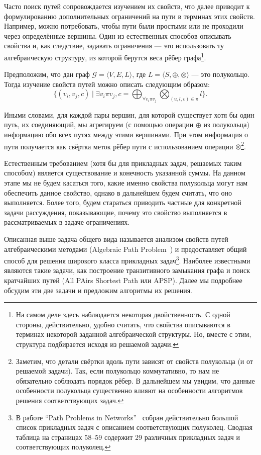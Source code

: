 Часто поиск путей сопровождается изучением их свойств, что далее приводит к формулированию дополнительных ограничений на пути в терминах этих свойств. Например, можно потребовать, чтобы пути были простыми или не проходили через определённые вершины. Один из естественных способов описывать свойства и, как следствие, задавать ограничения --- это использовать ту алгебраическую структуру, из которой берутся веса рёбер графа\footnote{На самом деле здесь наблюдается некоторая двойственность. С одной стороны, действительно, удобно считать, что свойства описываются в терминах некоторой заданной алгебраической структуры. Но, вместе с этим, структура подбирается исходя из решаемой задачи.}.

Предположим, что дан граф $\mathcal{G} = \langle V, E, L\rangle $, где $L = \langle S, \oplus, \otimes \rangle$ --- это полукольцо. Тогда изучение свойств путей можно описать следующим образом:
\begin{equation} \label{eq:algPathProblem}
  \{(v_i, v_j, c) \mid \exists v_i \pi v_j, c = \bigoplus_{\forall v_i \pi v_j} \bigotimes_{(u,l,v) \in \pi } l \}.
\end{equation}

Иными словами, для каждой пары вершин, для которой существует хотя бы один путь, их соединяющий, мы агрегируем (с помощью операции $\oplus$ из полукольца) информацию обо всех путях между этими вершинами. При этом информация о пути получается как свёртка меток рёбер пути с использованием операции $\otimes$\footnote{Заметим, что детали свёртки вдоль пути зависят от свойств полукольца (и от решаемой задачи). Так, если полукольцо коммутативно, то нам не обязательно соблюдать порядок рёбер. В дальнейшем мы увидим, что данные особенности полукольца существенно влияют на особенности алгоритмов решения соответствующих задач.}.

Естественным требованием (хотя бы для прикладных задач, решаемых таким способом) является существование и конечность указанной суммы. На данном этапе мы не будем касаться того, какие именно свойства полукольца могут нам обеспечить данное свойство, однако в дальнейшем будем считать, что оно выполняется. Более того, будем стараться приводить частные для конкретной задачи рассуждения, показывающие, почему это свойство выполняется в рассматриваемых в задаче ограничениях.

Описанная выше задача общего вида называется анализом свойств путей алгебраическими методами (Algebraic Path Problem~\cite{Baras2010PathPI}) и предоставляет общий способ для решения широкого класса прикладных задач\footnote{В работе ``Path Problems in Networks''~\cite{Baras2010PathPI} собран действительно большой список прикладных задач с описанием соответствующих полуколец. Сводная таблица на страницах 58--59 содержит 29 различных прикладных задач и соответствующих полуколец.}. Наиболее известными являются такие задачи, как построение транзитивного замыкания графа и поиск кратчайших путей (All PAirs Shortest Path или APSP). Далее мы подробнее обсудим эти две задачи и предложим алгоритмы их решения.



